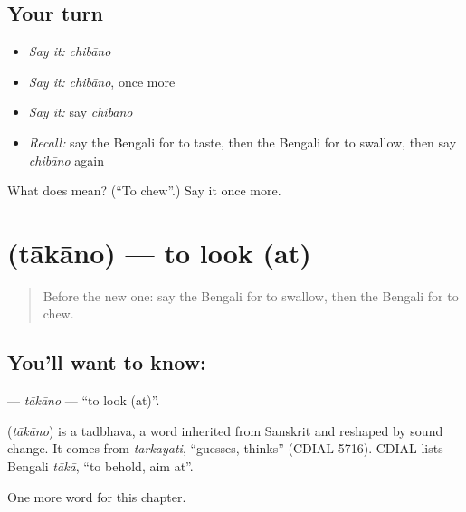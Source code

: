 \subsection*{Your turn}
\begin{itemize}
\raggedright
  \item \emph{Say it:} \emph{chibāno}
  \item \emph{Say it:} \emph{chibāno}, once more
  \item \emph{Say it:} say \emph{chibāno}
  \item \emph{Recall:} say the Bengali for to taste, then the Bengali for to swallow, then say \emph{chibāno} again
\end{itemize}

\begin{tcolorbox}[breakable,colback=teal!4,colframe=teal!35!black,title={Before you move on}]
What does  mean? (\textquotedblleft{}To chew\textquotedblright{}.) Say it once more.
\end{tcolorbox}
\section[\texorpdfstring{\bn{তাকানো} (tākāno)}{তাকানো (tākāno)}]{ (tākāno) — to look (at)}

\label{lesson:BN-C179-takano}



\begin{quote}
Before the new one: say the Bengali for to swallow, then the Bengali for to chew.
\end{quote}

\subsection*{You'll want to know: }
\textbf{} — \emph{tākāno} — \textquotedblleft{}to look (at)\textquotedblright{}.

\begin{cousinweb}
\textbf{} (\emph{tākāno}) is a tadbhava, a word inherited from Sanskrit and reshaped by sound change. It comes from \emph{tarkayati}, \textquotedblleft{}guesses, thinks\textquotedblright{} (CDIAL 5716). CDIAL lists Bengali \emph{tākā}, \textquotedblleft{}to behold, aim at\textquotedblright{}.
\end{cousinweb}

\begin{grammarlens}[title={What you've built}]
One more word for this chapter.
\end{grammarlens}


